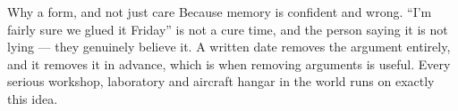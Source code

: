 \begin{telospanel}{Why a form, and not just care}
Because memory is confident and wrong. ``I'm fairly sure we glued it Friday'' is
not a cure time, and the person saying it is not lying --- they genuinely believe
it. A written date removes the argument entirely, and it removes it in advance,
which is when removing arguments is useful. Every serious workshop, laboratory
and aircraft hangar in the world runs on exactly this idea.
\end{telospanel}

